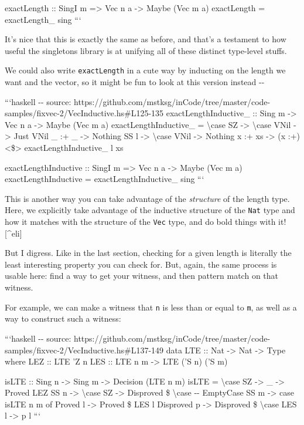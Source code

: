\documentclass[]{article}
\begin{document}
exactLength :: SingI m =\textgreater{} Vec n a -\textgreater{} Maybe (Vec m a)
exactLength = exactLength\_ sing ```

It's nice that this is exactly the same as before, and that's a testament to how
useful the singletons library is at unifying all of these distinct type-level
stuffs.

We could also write \texttt{exactLength} in a cute way by inducting on the
length we want and the vector, so it might be fun to look at this version
instead -\/-

```haskell -\/- source:
https://github.com/mstksg/inCode/tree/master/code-samples/fixvec-2/VecInductive.hs\#L125-135
exactLengthInductive\_ :: Sing m -\textgreater{} Vec n a -\textgreater{} Maybe
(Vec m a) exactLengthInductive\_ = \textbackslash{}case SZ -\textgreater{}
\textbackslash{}case VNil -\textgreater{} Just VNil \_ :+ \_ -\textgreater{}
Nothing SS l -\textgreater{} \textbackslash{}case VNil -\textgreater{} Nothing x
:+ xs -\textgreater{} (x :+) \textless{}\$\textgreater{} exactLengthInductive\_
l xs

exactLengthInductive :: SingI m =\textgreater{} Vec n a -\textgreater{} Maybe
(Vec m a) exactLengthInductive = exactLengthInductive\_ sing ```

This is another way you can take advantage of the \emph{structure} of the length
type. Here, we explicitly take advantage of the inductive structure of the
\texttt{Nat} type and how it matches with the structure of the \texttt{Vec}
type, and do bold things with it!{[}\^{}eli{]}

But I digress. Like in the last section, checking for a given length is
literally the least interesting property you can check for. But, again, the same
process is usable here: find a way to get your witness, and then pattern match
on that witness.

For example, we can make a witness that \texttt{n} is less than or equal to
\texttt{m}, as well as a way to construct such a witness:

```haskell -\/- source:
https://github.com/mstksg/inCode/tree/master/code-samples/fixvec-2/VecInductive.hs\#L137-149
data LTE :: Nat -\textgreater{} Nat -\textgreater{} Type where LEZ :: LTE 'Z n
LES :: LTE n m -\textgreater{} LTE ('S n) ('S m)

isLTE :: Sing n -\textgreater{} Sing m -\textgreater{} Decision (LTE n m) isLTE
= \textbackslash{}case SZ -\textgreater{} \_ -\textgreater{} Proved LEZ SS n
-\textgreater{} \textbackslash{}case SZ -\textgreater{} Disproved \$
\textbackslash{}case -\/- EmptyCase SS m -\textgreater{} case isLTE n m of
Proved l -\textgreater{} Proved \$ LES l Disproved p -\textgreater{} Disproved
\$ \textbackslash{}case LES l -\textgreater{} p l ```
\end{document}
